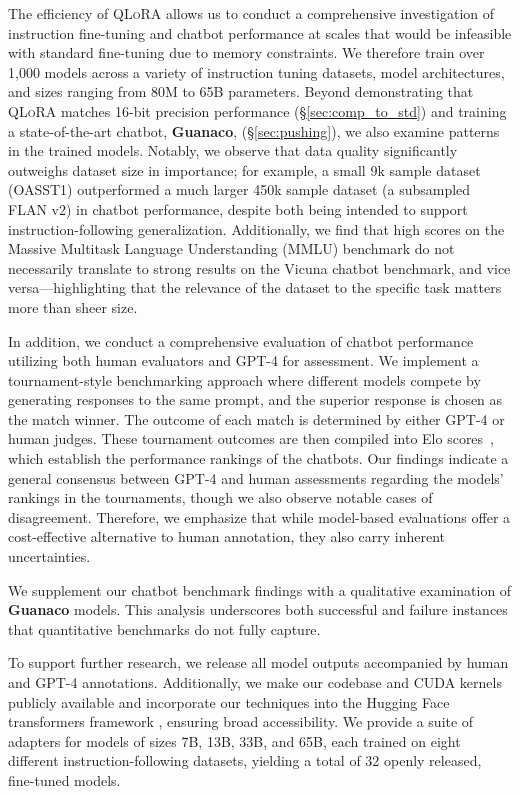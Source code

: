 The efficiency of \textsc{QLoRA} allows us to conduct a comprehensive investigation of instruction fine-tuning and chatbot performance at scales that would be infeasible with standard fine-tuning due to memory constraints. We therefore train over 1,000 models across a variety of instruction tuning datasets, model architectures, and sizes ranging from 80M to 65B parameters. Beyond demonstrating that \textsc{QLoRA} matches 16-bit precision performance (\S\ref{sec:comp_to_std}) and training a state-of-the-art chatbot, \textbf{Guanaco}, (\S\ref{sec:pushing}), we also examine patterns in the trained models. Notably, we observe that data quality significantly outweighs dataset size in importance; for example, a small 9k sample dataset (OASST1) outperformed a much larger 450k sample dataset (a subsampled FLAN v2) in chatbot performance, despite both being intended to support instruction-following generalization. Additionally, we find that high scores on the Massive Multitask Language Understanding (MMLU) benchmark do not necessarily translate to strong results on the Vicuna chatbot benchmark, and vice versa—highlighting that the relevance of the dataset to the specific task matters more than sheer size.

In addition, we conduct a comprehensive evaluation of chatbot performance utilizing both human evaluators and GPT-4 for assessment. We implement a tournament-style benchmarking approach where different models compete by generating responses to the same prompt, and the superior response is chosen as the match winner. The outcome of each match is determined by either GPT-4 or human judges. These tournament outcomes are then compiled into Elo scores~\citep{elo1967proposed, elo1978rating}, which establish the performance rankings of the chatbots. Our findings indicate a general consensus between GPT-4 and human assessments regarding the models' rankings in the tournaments, though we also observe notable cases of disagreement. Therefore, we emphasize that while model-based evaluations offer a cost-effective alternative to human annotation, they also carry inherent uncertainties.

We supplement our chatbot benchmark findings with a qualitative examination of \textbf{Guanaco} models. This analysis underscores both successful and failure instances that quantitative benchmarks do not fully capture.

To support further research, we release all model outputs accompanied by human and GPT-4 annotations. Additionally, we make our codebase and CUDA kernels publicly available and incorporate our techniques into the Hugging Face transformers framework \citep{wolf2019huggingface}, ensuring broad accessibility. We provide a suite of adapters for models of sizes 7B, 13B, 33B, and 65B, each trained on eight different instruction-following datasets, yielding a total of 32 openly released, fine-tuned models.

